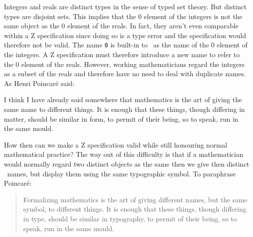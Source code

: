\documentclass{amsart}
\begin{document}
Integers and reals are distinct types in the sense of typed set theory.
But distinct types are disjoint sets.
This implies that the $0$ element of the integers is not the same object as the $0$ element of the reals.
In fact, they aren't even comparable within a Z specification since doing so is a type error and the 
specification would therefore not be valid.
The name \texttt{0} is built-in to \ZN\  as the name of the $0$ element of the integers.
A Z specification must therefore introduce a new name to refer to the $0$ element of the reals.
However, working mathematicians regard the integers as a subset of the reals and therefore have no need to deal with duplicate names.
As Henri Poincar\'{e} \cite{poincare-fm} said:
\begin{displayquote}
I think I have already said somewhere that mathematics is the art of giving the same name to different things. 
It is enough that these things, though differing in matter, should be similar in form, to permit of their being, so to speak, run in the same mould.\end{displayquote}

How then can we make a Z specification valid while still honouring normal mathematical practice?
The way out of this difficulty is that if a mathematician would normally regard two distinct objects as the same
then we give then distinct \ZN\  names, but display them using the same typographic symbol.
To paraphrase Poincar\'{e}:
\begin{quote}
Formalizing mathematics is the art of giving different names, but the same symbol, to different things. 
It is enough that these things, though differing in type, should be similar in typography, 
to permit of their being, so to speak, run in the same mould.
\end{quote}
\end{document}
